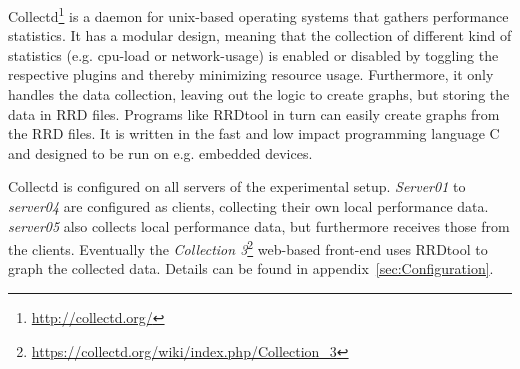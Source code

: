 Collectd\footnote{\url{http://collectd.org/}} is a daemon for unix-based operating systems that gathers performance statistics. It has a modular design, meaning that the collection of different kind of statistics (e.g. cpu-load or network-usage) is enabled or disabled by toggling the respective plugins and thereby minimizing resource usage. Furthermore, it only handles the data collection, leaving out the logic to create graphs, but storing the data in \ac{RRD} files. Programs like RRDtool in turn can easily create graphs from the RRD files. It is written in the fast and low impact programming language C~\cite{prechelt2000empirical} and designed to be run on e.g. embedded devices.

Collectd is configured on all servers of the experimental setup. \emph{Server01} to \emph{server04} are configured as clients, collecting their own local performance data. \emph{server05} also collects local performance data, but furthermore receives those from the clients. Eventually the \emph{Collection 3}\footnote{\url{https://collectd.org/wiki/index.php/Collection_3}} web-based front-end uses RRDtool to graph the collected data. Details can be found in appendix~\ref{sec:Configuration}.
